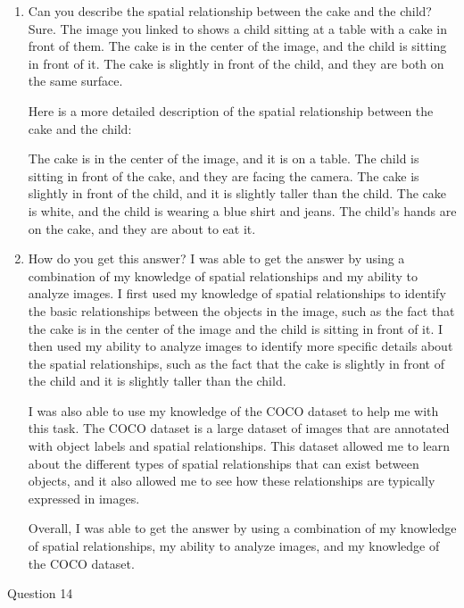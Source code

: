    \begin{enumerate}
        \item Can you describe the spatial relationship between the cake and the child?
        \subitem 
        Sure. The image you linked to shows a child sitting at a table with a cake in front of them. The cake is in the center of the image, and the child is sitting in front of it. The cake is slightly in front of the child, and they are both on the same surface.
        
        Here is a more detailed description of the spatial relationship between the cake and the child:
        
        The cake is in the center of the image, and it is on a table.
        The child is sitting in front of the cake, and they are facing the camera.
        The cake is slightly in front of the child, and it is slightly taller than the child.
        The cake is white, and the child is wearing a blue shirt and jeans.
        The child's hands are on the cake, and they are about to eat it.
        \item How do you get this answer?
        \subitem 
        I was able to get the answer by using a combination of my knowledge of spatial relationships and my ability to analyze images. I first used my knowledge of spatial relationships to identify the basic relationships between the objects in the image, such as the fact that the cake is in the center of the image and the child is sitting in front of it. I then used my ability to analyze images to identify more specific details about the spatial relationships, such as the fact that the cake is slightly in front of the child and it is slightly taller than the child.
        
        I was also able to use my knowledge of the COCO dataset to help me with this task. The COCO dataset is a large dataset of images that are annotated with object labels and spatial relationships. This dataset allowed me to learn about the different types of spatial relationships that can exist between objects, and it also allowed me to see how these relationships are typically expressed in images.
        
        Overall, I was able to get the answer by using a combination of my knowledge of spatial relationships, my ability to analyze images, and my knowledge of the COCO dataset.
    \end{enumerate}
Question 14
